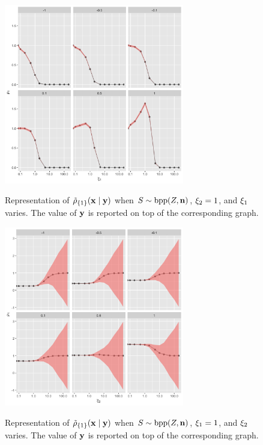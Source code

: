 \begin{figure}[H]
\centering
\caption{Representation of $\tilde{\rho}_{\lbrace 1\rbrace}(\mathbf{x}\mid\mathbf{y})$ when $S \sim \mathrm{bpp}(Z,\mathbf{n})$, $\xi_{2} = 1$, and $\xi_{1}$ varies. The value of $\mathbf{y}$ is reported on top of the corresponding graph.}
\includegraphics[width = 0.7\textwidth]{fig/rho_1_beta.png}
\label{fig:rho_1_beta}
\end{figure}

\begin{figure}[H]
\centering
\caption{Representation of $\tilde{\rho}_{\lbrace 1\rbrace}(\mathbf{x}\mid\mathbf{y})$ when $S \sim \mathrm{bpp}(Z,\mathbf{n})$, $\xi_{1} = 1$, and $\xi_{2}$ varies. The value of $\mathbf{y}$ is reported on top of the corresponding graph.}
\includegraphics[width = 0.7\textwidth]{fig/rho_1_gamma.png}
\label{fig:rho_1_gamma}
\end{figure}

